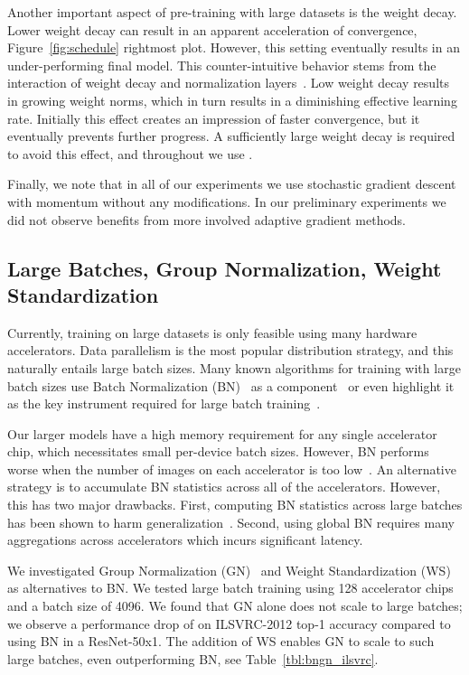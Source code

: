 \documentclass[runningheads]{llncs}
\newcommand{\imagenet}{{ILSVRC-2012}}
\begin{document}
Another important aspect of pre-training with large datasets is the weight decay.
Lower weight decay can result in an apparent acceleration of convergence, Figure~\ref{fig:schedule} rightmost plot.
However, this setting eventually results in an under-performing final model.
This counter-intuitive behavior stems from the interaction of weight decay and normalization layers~\cite{laarhoven17b,li2019exponential}.
Low weight decay results in growing weight norms, which in turn results in a diminishing effective learning rate. Initially this effect creates an impression of faster convergence, but it eventually prevents further progress.
A sufficiently large weight decay is required to avoid this effect, and throughout we use .

Finally, we note that in all of our experiments we use stochastic gradient descent with momentum without any modifications.
In our preliminary experiments we did not observe benefits from more involved adaptive gradient methods. 

\subsection{Large Batches, Group Normalization, Weight Standardization}
\label{sec:gn}

Currently, training on large datasets is only feasible using many hardware accelerators.
Data parallelism is the most popular distribution strategy, and this naturally entails large batch sizes.
Many known algorithms for training with large batch sizes use Batch Normalization (BN)~\cite{ioffe2015batch} as a component~\cite{Goyal2017AccurateLM} or even highlight it as the key instrument required for large batch training~\cite{de2019bn}. 

Our larger models have a high memory requirement for any single accelerator chip, which necessitates small per-device batch sizes.
However, BN performs worse when the number of images on each accelerator is too low~\cite{ioffe2017renorm}.
An alternative strategy is to accumulate BN statistics across all of the accelerators.
However, this has two major drawbacks.
First, computing BN statistics across large batches has been shown to harm generalization~\cite{de2019bn}.
Second, using global BN requires many aggregations across accelerators which incurs significant latency.

We investigated Group Normalization (GN)~\cite{wu2018group} and Weight Standardization (WS)~\cite{qiao2019weight} as alternatives to BN.
We tested large batch training using 128 accelerator chips and a batch size of 4096.
We found that GN alone does not scale to large batches; we observe a performance drop of  on \imagenet{} top-1 accuracy compared to using BN in a ResNet-50x1.
The addition of WS enables GN to scale to such large batches, even outperforming BN, see Table~\ref{tbl:bngn_ilsvrc}.
\end{document}
